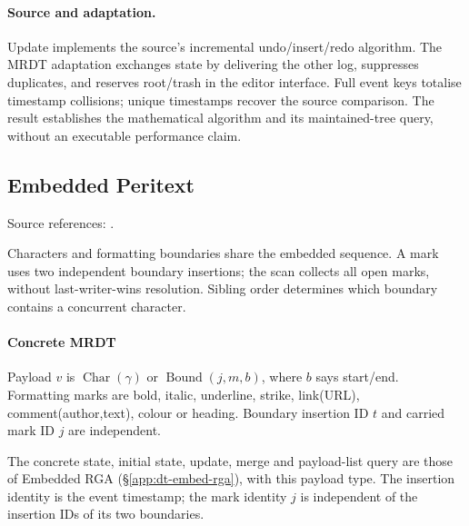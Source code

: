\paragraph{Source and adaptation.}
Update implements the source's incremental undo/insert/redo algorithm.
The MRDT adaptation exchanges state by delivering the other log, suppresses
duplicates, and reserves root/trash in the editor interface. Full event keys
totalise timestamp collisions; unique timestamps recover the source comparison.
The result establishes the mathematical algorithm and its maintained-tree
query, without an executable performance claim.

\subsection{Embedded Peritext}
\label{app:dt-peritext-embed-rga}

\noindent Source references: \cite{Peritext}.







Characters and formatting boundaries share the embedded sequence. A mark uses two independent boundary insertions; the scan collects all open marks, without last-writer-wins resolution. Sibling order determines which boundary contains a concurrent character.

\paragraph{Concrete MRDT}
Payload $v$ is $\operatorname{Char}(\gamma)$ or $\operatorname{Bound}(j,m,b)$, where $b$ says start/end. Formatting marks are bold, italic, underline, strike, link(URL), comment(author,text), colour or heading. Boundary insertion ID $t$ and carried mark ID $j$ are independent.

The concrete state, initial state, update, merge and payload-list query are
those of Embedded RGA (\S\ref{app:dt-embed-rga}), with this payload type.
The insertion identity is the event timestamp; the mark identity $j$ is
independent of the insertion IDs of its two boundaries.

